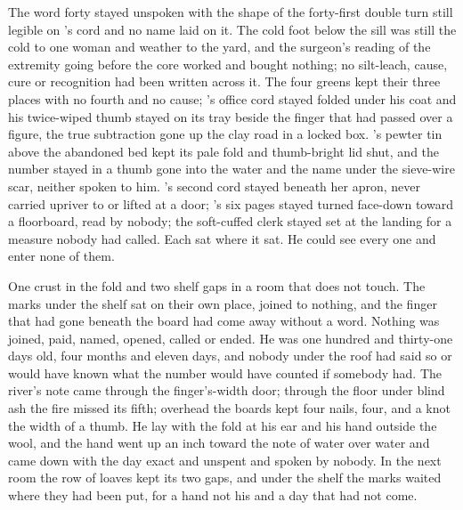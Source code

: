 The word forty stayed unspoken with the shape of the forty-first double turn still legible on 's cord and no name laid on it. The cold foot below the sill was still the cold to one woman and weather to the yard, and the surgeon's reading of the extremity going before the core worked and bought nothing; no silt-leach, cause, cure or recognition had been written across it. The four greens kept their three places with no fourth and no cause; 's office cord stayed folded under his coat and his twice-wiped thumb stayed on its tray beside the finger that had passed over a figure, the true subtraction gone up the clay road in a locked box. 's pewter tin above the abandoned bed kept its pale fold and thumb-bright lid shut, and the number stayed in a thumb gone into the water and the name under the sieve-wire scar, neither spoken to him. 's second cord stayed beneath her apron, never carried upriver to  or lifted at a door; 's six pages stayed turned face-down toward a floorboard, read by nobody; the soft-cuffed clerk stayed set at the landing for a measure nobody had called. Each sat where it sat. He could see every one and enter none of them.

One crust in the fold and two shelf gaps in a room that does not touch. The marks under the shelf sat on their own place, joined to nothing, and the finger that had gone beneath the board had come away without a word. Nothing was joined, paid, named, opened, called or ended. He was one hundred and thirty-one days old, four months and eleven days, and nobody under the roof had said so or would have known what the number would have counted if somebody had. The river's note came through the finger's-width door; through the floor under blind ash the fire missed its fifth; overhead the boards kept four nails, four, and a knot the width of a thumb. He lay with the fold at his ear and his hand outside the wool, and the hand went up an inch toward the note of water over water and came down with the day exact and unspent and spoken by nobody. In the next room the row of loaves kept its two gaps, and under the shelf the marks waited where they had been put, for a hand not his and a day that had not come.
